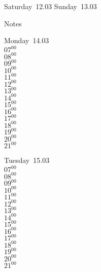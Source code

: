 \documentclass[11pt,a4paper]{book}\usepackage[]{graphicx}\usepackage[]{color}
\begin{document}
\begin{weekendbox}
  Saturday~12.03
  \tcblower
  Sunday~13.03
\end{weekendbox} %
\begin{notebox}
  Notes
\end{notebox}
\clearpage
\begin{headerbox}
\end{headerbox}
\begin{weekdaybox}
  Monday~14.03\\
  { 
  \vfill
  $07^{00}$\\
$08^{00}$\\
$09^{00}$\\
$10^{00}$\\
$11^{00}$\\
$12^{00}$\\
$13^{00}$\\
$14^{00}$\\
$15^{00}$\\
$16^{00}$\\
$17^{00}$\\
$18^{00}$\\
$19^{00}$\\
$20^{00}$\\
$21^{00}$\\
  }
\end{weekdaybox}
\begin{weekdaybox}
  Tuesday~15.03\\
  { 
  \vfill
  $07^{00}$\\
$08^{00}$\\
$09^{00}$\\
$10^{00}$\\
$11^{00}$\\
$12^{00}$\\
$13^{00}$\\
$14^{00}$\\
$15^{00}$\\
$16^{00}$\\
$17^{00}$\\
$18^{00}$\\
$19^{00}$\\
$20^{00}$\\
$21^{00}$\\
  }
\end{weekdaybox}
\end{document}
